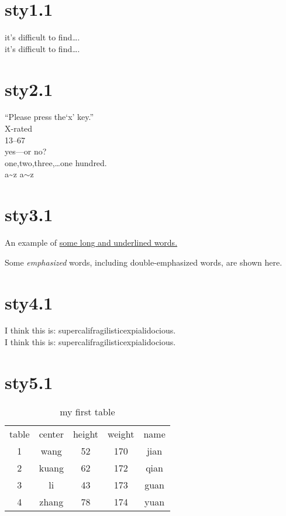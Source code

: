 \documentclass{article}
\begin{document}
\section{sty1.1}%
it's difficult to find\ldots.\\
it's difficult to f{}ind\ldots.


\section{sty2.1}%
``Please press the`x' key.''\\

X-rated\\13--67\\yes---or no?\\

one,two,three,\ldots one hundred.\\

a\~{}z \qquad a$\sim$z


\section{sty3.1}%
An example of \underline{some long and underlined words.}

Some \emph{emphasized} words, including double-emphasized words, are shown here.


\section{sty4.1}%
I think this is: supercalifragilisticexpialidocious.\\
I think this is: su\-per\-cal\-ifrag\-ilistic\-ex\-pi\-alidocious.


\section{sty5.1}%
\begin{table}[h]
  \centering
\begin{tabular}{ccccc}
table & center & height & weight & name\\
1 & wang & 52 & 170 & jian\\
2 & kuang & 62 & 172 & qian\\
3 & li & 43 & 173 & guan\\
4 & zhang & 78 & 174 & yuan\\
\end{tabular}
  \caption{my first table }\label{tab1}
\end{table}
\end{document}
